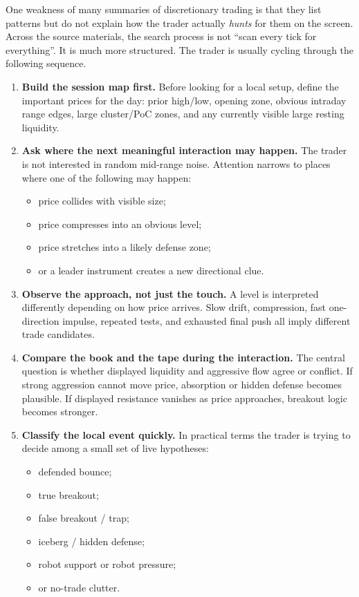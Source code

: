 One weakness of many summaries of discretionary trading is that they list patterns but do not explain how the trader actually \emph{hunts} for them on the screen.
Across the source materials, the search process is not ``scan every tick for everything''.
It is much more structured.
The trader is usually cycling through the following sequence.

\begin{enumerate}
  \item \textbf{Build the session map first.}
  Before looking for a local setup, define the important prices for the day: prior high/low, opening zone, obvious intraday range edges, large cluster/PoC zones, and any currently visible large resting liquidity.

  \item \textbf{Ask where the next meaningful interaction may happen.}
  The trader is not interested in random mid-range noise.
  Attention narrows to places where one of the following may happen:
  \begin{itemize}
    \item price collides with visible size;
    \item price compresses into an obvious level;
    \item price stretches into a likely defense zone;
    \item or a leader instrument creates a new directional clue.
  \end{itemize}

  \item \textbf{Observe the approach, not just the touch.}
  A level is interpreted differently depending on how price arrives.
  Slow drift, compression, fast one-direction impulse, repeated tests, and exhausted final push all imply different trade candidates.

  \item \textbf{Compare the book and the tape during the interaction.}
  The central question is whether displayed liquidity and aggressive flow agree or conflict.
  If strong aggression cannot move price, absorption or hidden defense becomes plausible.
  If displayed resistance vanishes as price approaches, breakout logic becomes stronger.

  \item \textbf{Classify the local event quickly.}
  In practical terms the trader is trying to decide among a small set of live hypotheses:
  \begin{itemize}
    \item defended bounce;
    \item true breakout;
    \item false breakout / trap;
    \item iceberg / hidden defense;
    \item robot support or robot pressure;
    \item or no-trade clutter.
  \end{itemize}


\end{enumerate}
